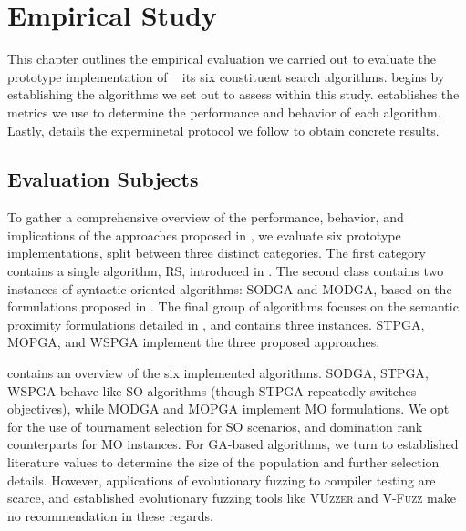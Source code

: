 \chapter{\label{cha:study}Empirical Study}

This chapter outlines the empirical evaluation we carried out
to evaluate the prototype implementation of \kf~ its six
constituent search algorithms.
 begins by establishing the algorithms
we set out to assess within this study.
 establishes the metrics we use to determine the
performance and behavior of each algorithm.
Lastly,  details the experminetal protocol
we follow to obtain concrete results.

\section{\label{sec:subjects}Evaluation Subjects}


To gather a comprehensive overview of the performance, behavior,
and implications of the approaches proposed in ,
we evaluate six prototype implementations, split between three distinct categories.
The first category contains a single algorithm, \gls{RS},
introduced in .
The second class contains two instances of syntactic-oriented
algorithms: \gls{SODGA} and \gls{MODGA}, based on the formulations
proposed in .
The final group of algorithms focuses on the semantic proximity
formulations detailed in , and contains three instances.
\gls{STPGA}, \gls{MOPGA}, and \gls{WSPGA}
implement the three proposed approaches.

 contains an overview of the six implemented algorithms.
\gls{SODGA}, \gls{STPGA}, \gls{WSPGA} behave like \gls{SO} algorithms
(though \gls{STPGA} repeatedly switches objectives),
while \gls{MODGA} and \gls{MOPGA} implement \gls{MO} formulations.
We opt for the use of tournament selection for \gls{SO} scenarios, and
domination rank counterparts for \gls{MO} instances.
For \gls{GA}-based algorithms, we turn to established literature values
to determine the size of the population and further selection details.
However, applications of evolutionary fuzzing to
compiler testing are scarce, and established evolutionary fuzzing
tools like \textsc{VUzzer} \cite{rawat2017vuzzer} and
\textsc{V-Fuzz} \cite{li2019v} make no recommendation in these regards.

